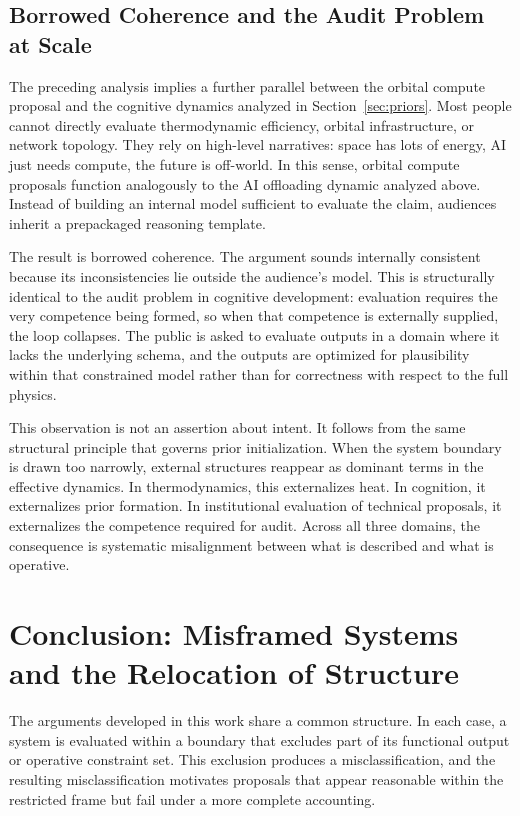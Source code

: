 \documentclass[11pt,a4paper]{article}
\theoremstyle{plain}
\theoremstyle{definition}
\theoremstyle{remark}
\begin{document}
\subsection{Borrowed Coherence and the Audit Problem at Scale}

The preceding analysis implies a further parallel between the orbital compute
proposal and the cognitive dynamics analyzed in Section~\ref{sec:priors}. Most
people cannot directly evaluate thermodynamic efficiency, orbital infrastructure,
or network topology. They rely on high-level narratives: space has lots of
energy, AI just needs compute, the future is off-world. In this sense, orbital
compute proposals function analogously to the AI offloading dynamic analyzed
above. Instead of building an internal model sufficient to evaluate the claim,
audiences inherit a prepackaged reasoning template.

The result is borrowed coherence. The argument sounds internally consistent
because its inconsistencies lie outside the audience's model. This is structurally
identical to the audit problem in cognitive development: evaluation requires the
very competence being formed, so when that competence is externally supplied, the
loop collapses. The public is asked to evaluate outputs in a domain where it
lacks the underlying schema, and the outputs are optimized for plausibility
within that constrained model rather than for correctness with respect to the
full physics.

This observation is not an assertion about intent. It follows from the same
structural principle that governs prior initialization. When the system boundary
is drawn too narrowly, external structures reappear as dominant terms in the
effective dynamics. In thermodynamics, this externalizes heat. In cognition, it
externalizes prior formation. In institutional evaluation of technical proposals,
it externalizes the competence required for audit. Across all three domains, the
consequence is systematic misalignment between what is described and what is
operative.

\section{Conclusion: Misframed Systems and the Relocation of Structure}
\label{sec:conclusion}

The arguments developed in this work share a common structure. In each case, a
system is evaluated within a boundary that excludes part of its functional output
or operative constraint set. This exclusion produces a misclassification, and the
resulting misclassification motivates proposals that appear reasonable within the
restricted frame but fail under a more complete accounting.
\end{document}
